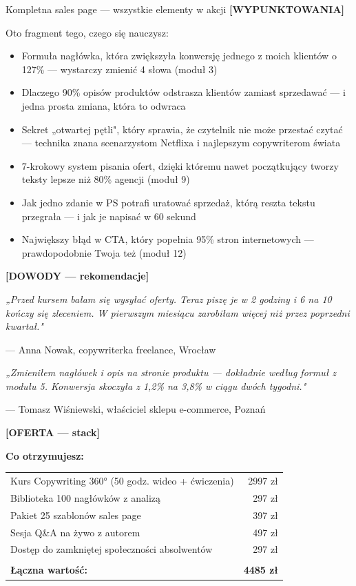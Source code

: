 \documentclass[
  12pt,
  a4paper,
  twoside,
  openright,
  12pt,
  DIV=12,
  BCOR=12mm]{scrbook}
\begin{document}
\begin{przyklad}{Kompletna sales page --- wszystkie elementy w akcji}
\bigskip
\textbf{[WYPUNKTOWANIA]}

Oto fragment tego, czego się nauczysz:

\begin{itemize}
  \item Formuła nagłówka, która zwiększyła konwersję jednego z moich klientów o 127\% --- wystarczy zmienić 4 słowa (moduł 3)
  \item Dlaczego 90\% opisów produktów odstrasza klientów zamiast sprzedawać --- i jedna prosta zmiana, która to odwraca
  \item Sekret „otwartej pętli", który sprawia, że czytelnik nie może przestać czytać --- technika znana scenarzystom Netflixa i najlepszym copywriterom świata
  \item 7-krokowy system pisania ofert, dzięki któremu nawet początkujący tworzy teksty lepsze niż 80\% agencji (moduł 9)
  \item Jak jedno zdanie w PS potrafi uratować sprzedaż, którą reszta tekstu przegrała --- i jak je napisać w 60 sekund
  \item Największy błąd w CTA, który popełnia 95\% stron internetowych --- prawdopodobnie Twoja też (moduł 12)
\end{itemize}

\bigskip
\textbf{[DOWODY --- rekomendacje]}

\textit{„Przed kursem bałam się wysyłać oferty. Teraz piszę je w 2 godziny i 6 na 10 kończy się zleceniem. W pierwszym miesiącu zarobiłam więcej niż przez poprzedni kwartał."}

--- Anna Nowak, copywriterka freelance, Wrocław

\medskip
\textit{„Zmieniłem nagłówek i opis na stronie produktu --- dokładnie według formuł z modułu 5. Konwersja skoczyła z 1,2\% na 3,8\% w ciągu dwóch tygodni."}

--- Tomasz Wiśniewski, właściciel sklepu e-commerce, Poznań

\bigskip
\textbf{[OFERTA --- stack]}

\textbf{Co otrzymujesz:}

\begin{tabular}{@{}p{}r@{}}
Kurs Copywriting 360° (50 godz. wideo + ćwiczenia) & 2997 zł \\
Biblioteka 100 nagłówków z analizą & 297 zł \\
Pakiet 25 szablonów sales page & 397 zł \\
Sesja Q\&A na żywo z autorem & 497 zł \\
Dostęp do zamkniętej społeczności absolwentów & 297 zł \\[6pt]
\hline\\[-6pt]
\textbf{Łączna wartość:} & \textbf{4485 zł} \\[6pt]
\end{tabular}


\end{przyklad}
\end{document}
